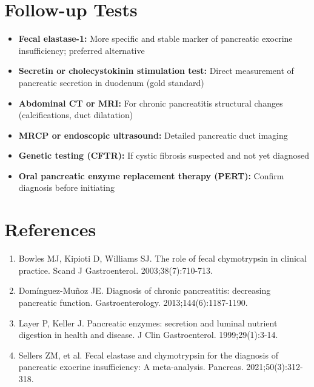 \section*{Follow-up Tests}
\begin{itemize}
  \item \textbf{Fecal elastase-1:} More specific and stable marker of pancreatic exocrine insufficiency; preferred alternative
  \item \textbf{Secretin or cholecystokinin stimulation test:} Direct measurement of pancreatic secretion in duodenum (gold standard)
  \item \textbf{Abdominal CT or MRI:} For chronic pancreatitis structural changes (calcifications, duct dilatation)
  \item \textbf{MRCP or endoscopic ultrasound:} Detailed pancreatic duct imaging
  \item \textbf{Genetic testing (CFTR):} If cystic fibrosis suspected and not yet diagnosed
  \item \textbf{Oral pancreatic enzyme replacement therapy (PERT):} Confirm diagnosis before initiating
\end{itemize}

\section*{References}
\begin{enumerate}
  \item Bowles MJ, Kipioti D, Williams SJ. The role of fecal chymotrypsin in clinical practice. Scand J Gastroenterol. 2003;38(7):710-713.
  \item Domínguez-Muñoz JE. Diagnosis of chronic pancreatitis: decreasing pancreatic function. Gastroenterology. 2013;144(6):1187-1190.
  \item Layer P, Keller J. Pancreatic enzymes: secretion and luminal nutrient digestion in health and disease. J Clin Gastroenterol. 1999;29(1):3-14.
  \item Sellers ZM, et al. Fecal elastase and chymotrypsin for the diagnosis of pancreatic exocrine insufficiency: A meta-analysis. Pancreas. 2021;50(3):312-318.
\end{enumerate}

\clearpage